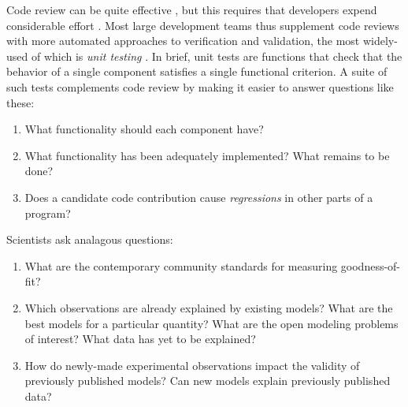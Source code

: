 \documentclass[9pt]{sig-alternate}
\begin{document}
Code review can be quite effective \cite{codereview}, but this requires that developers  expend considerable effort \cite{kemerer2009impact}. 
Most large development teams thus supplement code reviews with more {automated} approaches to verification and validation, the most widely-used  of which is \emph{unit testing} \cite{beck2003}. In brief, unit tests are functions that check that the behavior of a single component satisfies a single functional  criterion. 
A suite of such tests complements code review by making it easier to answer questions like these:
\begin{enumerate}
\item What functionality should each component have?
\item What functionality has been adequately implemented? What remains to be done?
\item Does a candidate code contribution cause \emph{regressions} in other parts of a program?
\end{enumerate}
Scientists ask analagous questions:
\begin{enumerate}
\item What are the contemporary community standards for measuring goodness-of-fit?
\item Which observations are already explained by existing models? What are the best models for a particular quantity? What are the open modeling problems of interest? What data has yet to be explained?
\item How do newly-made experimental observations impact the validity of previously published models? Can new models explain previously published data?
\end{enumerate}
\end{document}
